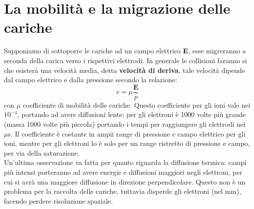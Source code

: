 \section{La mobilit\`a e la migrazione delle cariche}
Supponiamo di sottoporre le cariche ad un campo elettrico \textbf{E}, esse migreranno a seconda della carica verso i rispettivi elettrodi.
In generale le collisioni faranno si che esister\`a una velocit\`a media, detta \textbf{velocit\`a di deriva}, tale velocit\`a dipende dal campo
elettrico e dalla pressione secondo la relazione:
\begin{equation*}
v = \mu \frac{\mathbf{E}}{p}
\end{equation*}
con $\mu$ coefficiente di mobilit\`a delle cariche.
Questo coefficiente per gli ioni vale nei $10^{-4}$, portando ad avere diffusioni lente;
per gli elettroni \`e 1000 volte pi\`u  grande (massa 1000 volte pi\`u piccola) portando i tempi per raggiungere gli elettrodi nei $\mu$s.
Il coefficiente \`e costante in ampii range di pressione e campo elettrico per gli ioni, mentre per gli elettroni lo \`e solo per un 
range ristretto di pressione e campo, per via della saturazione.\\
Un'ultima osservazione va fatta per quanto riguarda la diffusione termica: campi pi\`u intensi porteranno ad avere energie e diffusioni maggiori negli elettroni,
per cui si avr\`a una maggiore diffusione in direzione perpendicolare.
Questo non \`e un problema per la raccolta delle cariche, tuttavia disperde gli elettroni (nel mm), facendo perdere risoluzione spaziale.
